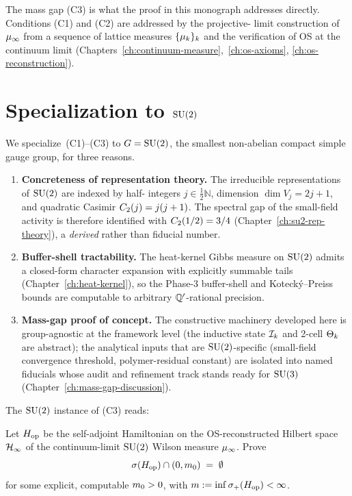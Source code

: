 The mass gap (C3) is what the proof in this monograph addresses
directly.  Conditions (C1) and (C2) are addressed by the projective-
limit construction of $\mu_\infty$ from a sequence of lattice measures
$\{\mu_k\}_{k}$ and the verification of OS at the continuum limit
(Chapters~\ref{ch:continuum-measure},~\ref{ch:os-axioms},
\ref{ch:os-reconstruction}).

\section{Specialization to \texorpdfstring{$\mathrm{SU}(2)$}{SU(2)}}
\label{sec:su2-specialization}

%
We specialize~(C1)--(C3) to $G = \mathrm{SU}(2)$, the smallest non-abelian
compact simple gauge group, for three reasons.

\begin{enumerate}[label=(S\arabic*)]
  \item \textbf{Concreteness of representation theory.}  The
    irreducible representations of $\mathrm{SU}(2)$ are indexed by half-
    integers $j \in \tfrac{1}{2}\mathbb{N}$, dimension $\dim V_j =
    2j + 1$, and quadratic Casimir $C_2(j) = j(j+1)$.  The
    spectral gap of the small-field activity is therefore identified
    with $C_2(1/2) = 3/4$ (Chapter~\ref{ch:su2-rep-theory}), a
    \emph{derived} rather than fiducial number.
  \item \textbf{Buffer-shell tractability.}  The heat-kernel Gibbs
    measure on $\mathrm{SU}(2)$ admits a closed-form character expansion
    with explicitly summable tails (Chapter~\ref{ch:heat-kernel}),
    so the Phase-3 buffer-shell and Kotecký--Preiss bounds are
    computable to arbitrary $\mathbb{Q}'$-rational precision.
  \item \textbf{Mass-gap proof of concept.}  The constructive
    machinery developed here is group-agnostic at the framework
    level (the inductive state $\mathcal{I}_k$ and 2-cell $\Theta_k$ are
    abstract); the analytical inputs that are $\mathrm{SU}(2)$-specific
    (small-field convergence threshold, polymer-residual constant)
    are isolated into named fiducials whose audit and refinement
    track stands ready for $\mathrm{SU}(3)$
    (Chapter~\ref{ch:mass-gap-discussion}).
\end{enumerate}

The $\mathrm{SU}(2)$ instance of (C3) reads:

\begin{milestone}
\label{milestone:su2-mass-gap}
Let $H_{\mathrm{op}}$ be the self-adjoint Hamiltonian on the OS-reconstructed
Hilbert space $\mathcal{H}_\infty$ of the continuum-limit $\mathrm{SU}(2)$ Wilson
measure $\mu_\infty$.  Prove
\[
  \sigma(H_{\mathrm{op}}) \cap (0, m_0) \;=\; \emptyset
\]
for some explicit, computable $m_0 > 0$, with $m := \inf
\sigma_+(H_{\mathrm{op}}) < \infty$.
\end{milestone}

